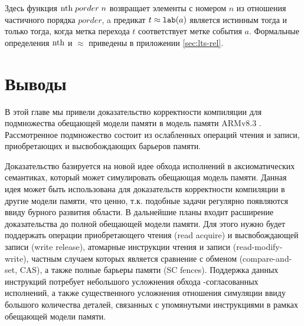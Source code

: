   Здесь функция $\mathrm{nth} \; porder \; n$ возвращает
  элементы с номером $n$ из отношения частичного порядка $porder$, 
  a предикат $t \approx {\mathtt{lab}}(a)$ является истинным тогда и только тогда, когда метка перехода $t$
  соответствует метке события $a$.
  Формальные определения  $\mathrm{nth}$ и $\approx$ приведены в приложении \ref{sec:lts-rel}.
\section{Выводы}
В этой главе мы привели доказательство корректности компиляции для подмножества
обещающей модели памяти \cite{Kang-al:POPL17} в модель памяти ARMv8.3 \cite{Pulte-al:POPL18}.
Рассмотренное подмножество состоит из ослабленных операций чтения и записи, приобретающих и высвобождающих барьеров памяти. 

Доказательство базируется на новой идее обхода исполнений в аксиоматических
семантиках, который может симулировать обещающая модель памяти. 
Данная идея может быть использована для доказательств
корректности компиляции в другие модели памяти, что ценно, т.к. подобные задачи регулярно появляются
ввиду бурного развития области.
В дальнейшие планы входит расширение доказательства
до полной обещающей модели памяти. Для этого нужно будет поддержать операции
приобретающего чтения (read acquire) и высвобождающей записи (write release),
атомарные инструкции чтения и записи (read-modify-write), частным случаем которых
является сравнение с обменом (compare-and-set, CAS), а также полные барьеры памяти (SC fences).
Поддержка данных инструкций потребует небольшого усложнения обхода \ARM-согласованных
исполнений, а также существенного усложнения отношения симуляции ввиду большого количества деталей,
связанных с упомянутыми инструкциями в рамках обещающей модели памяти.
